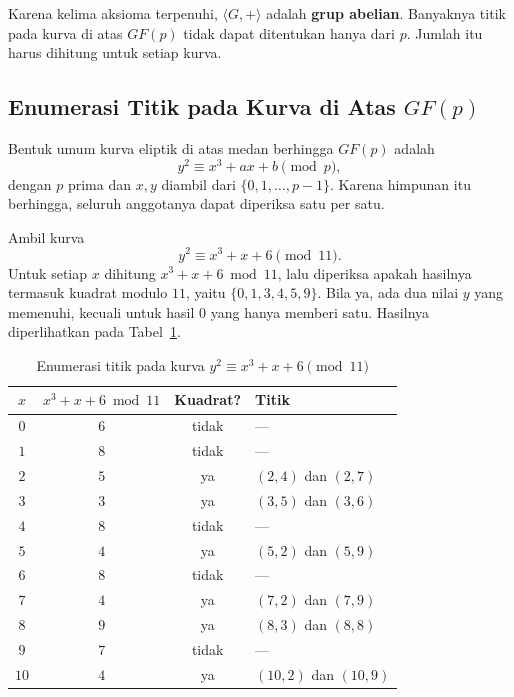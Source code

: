 Karena kelima aksioma terpenuhi, $\langle G, + \rangle$ adalah
\textbf{grup abelian}. Banyaknya titik pada kurva di atas $GF(p)$ tidak dapat
ditentukan hanya dari $p$. Jumlah itu harus dihitung untuk setiap kurva.

\subsection{Enumerasi Titik pada Kurva di Atas \texorpdfstring{$GF(p)$}{GF(p)}}
\label{subsec:enumerasi-gf-p}

Bentuk umum kurva eliptik di atas medan berhingga $GF(p)$ adalah
\[
y^2 \equiv x^3 + ax + b \pmod{p},
\]
dengan $p$ prima dan $x, y$ diambil dari $\{0, 1, \dots, p-1\}$. Karena
himpunan itu berhingga, seluruh anggotanya dapat diperiksa satu per satu.

Ambil kurva
\[
y^2 \equiv x^3 + x + 6 \pmod{11} .
\]
Untuk setiap $x$ dihitung $x^3 + x + 6 \bmod 11$, lalu diperiksa apakah
hasilnya termasuk kuadrat modulo $11$, yaitu $\{0, 1, 3, 4, 5, 9\}$. Bila ya,
ada dua nilai $y$ yang memenuhi, kecuali untuk hasil $0$ yang hanya memberi
satu. Hasilnya diperlihatkan pada Tabel~\ref{tab:enumerasi-gf11}.

\begin{table}[htbp]
    \centering
    \caption{Enumerasi titik pada kurva $y^2 \equiv x^3 + x + 6 \pmod{11}$}
    \label{tab:enumerasi-gf11}
    \begin{tabularx}{\linewidth}{@{}c c c
                                   >{\raggedright\arraybackslash}X@{}}
    \toprule
    $x$ & $x^3 + x + 6 \bmod 11$ & \textbf{Kuadrat?} & \textbf{Titik} \\
    \midrule
    $0$  & $6$  & tidak & --- \\
    \addlinespace
    $1$  & $8$  & tidak & --- \\
    \addlinespace
    $2$  & $5$  & ya    & $(2, 4)$ dan $(2, 7)$ \\
    \addlinespace
    $3$  & $3$  & ya    & $(3, 5)$ dan $(3, 6)$ \\
    \addlinespace
    $4$  & $8$  & tidak & --- \\
    \addlinespace
    $5$  & $4$  & ya    & $(5, 2)$ dan $(5, 9)$ \\
    \addlinespace
    $6$  & $8$  & tidak & --- \\
    \addlinespace
    $7$  & $4$  & ya    & $(7, 2)$ dan $(7, 9)$ \\
    \addlinespace
    $8$  & $9$  & ya    & $(8, 3)$ dan $(8, 8)$ \\
    \addlinespace
    $9$  & $7$  & tidak & --- \\
    \addlinespace
    $10$ & $4$  & ya    & $(10, 2)$ dan $(10, 9)$ \\
    \bottomrule
    \end{tabularx}
\end{table}

